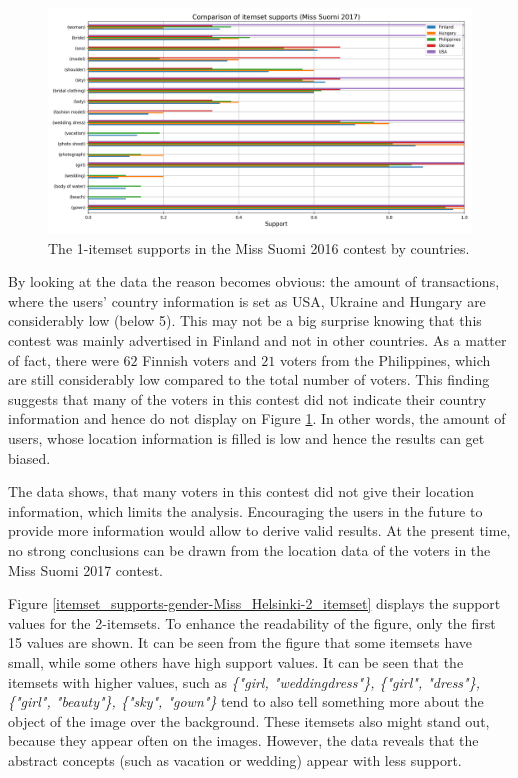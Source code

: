 \begin{figure}[h] 
    \begin{center}
        \includegraphics[width=1.0\textwidth]{Images/itemset_supports-country-Miss_Helsinki-1_itemset.png}
        \caption{The 1-itemset supports in the Miss Suomi 2016 contest by countries.}
        \label{itemset_supports-country-Miss_Helsinki-1_itemset}
    \end{center}
\end{figure}

By looking at the data the reason becomes obvious: the amount of transactions, where the users' country information is set as USA, Ukraine and Hungary are considerably low (below 5). This may not be a big surprise knowing that this contest was mainly advertised in Finland and not in other countries. As a matter of fact, there were $62$ Finnish voters and $21$ voters from the Philippines, which are still considerably low compared to the total number of voters. This finding suggests that many of the voters in this contest did not indicate their country information and hence do not display on Figure \ref{itemset_supports-country-Miss_Helsinki-1_itemset}. In other words, the amount of users, whose location information is filled is low and hence the results can get biased. 

The data shows, that many voters in this contest did not give their location information, which limits the analysis. Encouraging the users in the future to provide more information would allow to derive valid results. At the present time, no strong conclusions can be drawn from the location data of the voters in the Miss Suomi 2017 contest. 

Figure \ref{itemset_supports-gender-Miss_Helsinki-2_itemset} displays the support values for the 2-itemsets. To enhance the readability of the figure, only the first 15 values are shown. It can be seen from the figure that some itemsets have small, while some others have high support values. It can be seen that the itemsets with higher values, such as \emph{\{"girl, "wedding\:dress"\}, \{"girl", "dress"\}, \{"girl", "beauty"\}, \{"sky", "gown"\}} tend to also tell something more about the object of the image over the background. These itemsets also might stand out, because they appear often on the images. However, the data reveals that the abstract concepts (such as vacation or wedding) appear with less support. 

